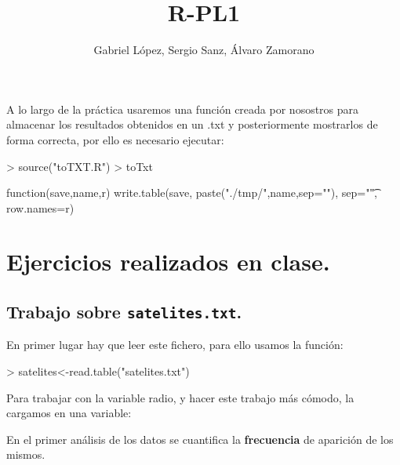 \documentclass [a4paper] {article}
\title{R-PL1}
\author{Gabriel L\'opez, Sergio Sanz, \'Alvaro Zamorano}
\begin{document}
\maketitle

A lo largo de la pr\'actica usaremos una funci\'on creada por nosostros para almacenar los resultados obtenidos en un .txt y posteriormente
mostrarlos de forma correcta, por ello es necesario ejecutar:
\begin{Schunk}
\begin{Sinput}
> source("toTXT.R")
> toTxt
\end{Sinput}
\begin{Soutput}
function(save,name,r) {
    write.table(save, paste("./tmp/",name,sep=""), sep="\t", row.names=r) 
}
\end{Soutput}
\end{Schunk}

\graphicspath{ {./tmp/} }

\section{Ejercicios realizados en clase.}
\subsection{Trabajo sobre \texttt{satelites.txt}.}

\bigskip
En primer lugar hay que leer este fichero, para ello usamos
la funci\'on:
\begin{Schunk}
\begin{Sinput}
> satelites<-read.table("satelites.txt")
\end{Sinput}
\end{Schunk}

\bigskip
Para trabajar con la variable radio, y hacer este trabajo m\'as
c\'omodo, la cargamos en una variable:
\begin{Schunk}
\end{Schunk}

\bigskip
En el primer an\'alisis de los datos se cuantifica la \textbf{frecuencia}
de aparici\'on de los mismos. 
\end{document}
